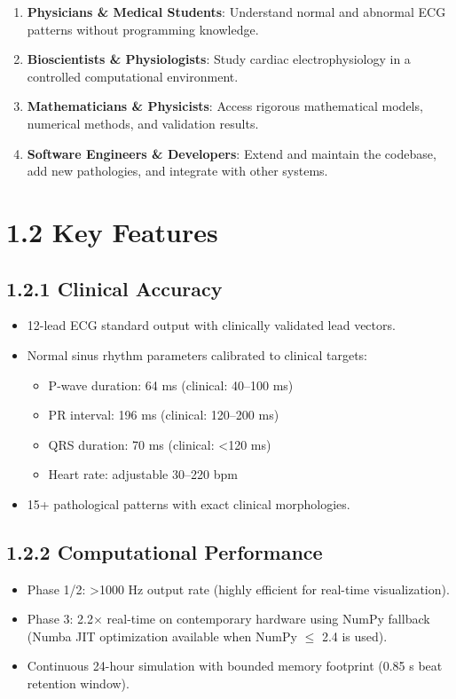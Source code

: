 \documentclass[12pt,oneside,a4paper]{book}
\begin{document}
\begin{enumerate}
  \item \textbf{Physicians \& Medical Students}: Understand normal and abnormal ECG patterns without programming knowledge.
  \item \textbf{Bioscientists \& Physiologists}: Study cardiac electrophysiology in a controlled computational environment.
  \item \textbf{Mathematicians \& Physicists}: Access rigorous mathematical models, numerical methods, and validation results.
  \item \textbf{Software Engineers \& Developers}: Extend and maintain the codebase, add new pathologies, and integrate with other systems.
\end{enumerate}

\section{1.2 Key Features}

\subsection{1.2.1 Clinical Accuracy}

\begin{itemize}
  \item 12-lead ECG standard output with clinically validated lead vectors.
  \item Normal sinus rhythm parameters calibrated to clinical targets:
    \begin{itemize}
      \item P-wave duration: 64 ms (clinical: 40--100 ms)
      \item PR interval: 196 ms (clinical: 120--200 ms)
      \item QRS duration: 70 ms (clinical: \textless 120 ms)
      \item Heart rate: adjustable 30--220 bpm
    \end{itemize}
  \item 15+ pathological patterns with exact clinical morphologies.
\end{itemize}

\subsection{1.2.2 Computational Performance}

\begin{itemize}
  \item Phase 1/2: \textgreater 1000 Hz output rate (highly efficient for real-time visualization).
  \item Phase 3: 2.2$\times$ real-time on contemporary hardware using NumPy fallback (Numba JIT optimization available when NumPy $\leq$ 2.4 is used).
  \item Continuous 24-hour simulation with bounded memory footprint (0.85 s beat retention window).
\end{itemize}
\end{document}
